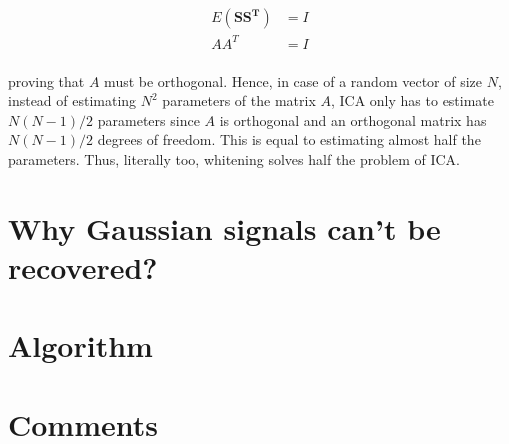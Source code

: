 \documentclass[11pt, a4paper]{article}
\begin{document}
\begin{align*}
	E(\boldsymbol{SS^T}) & = I \\
	AA^T                 & = I \\
\end{align*}

proving that $A$ must be orthogonal. Hence, in case of a random vector of size $N$, instead of estimating $N^2$ parameters of the matrix $A$, ICA only has to estimate $N(N-1)/2$ parameters since $A$ is orthogonal and an orthogonal matrix has $N(N-1)/2$ degrees of freedom. This is equal to estimating almost half the parameters. Thus, literally too, whitening solves half the problem of ICA.

\section{Why Gaussian signals can't be recovered?}

\section{Algorithm}

\section{Comments}
\end{document}
